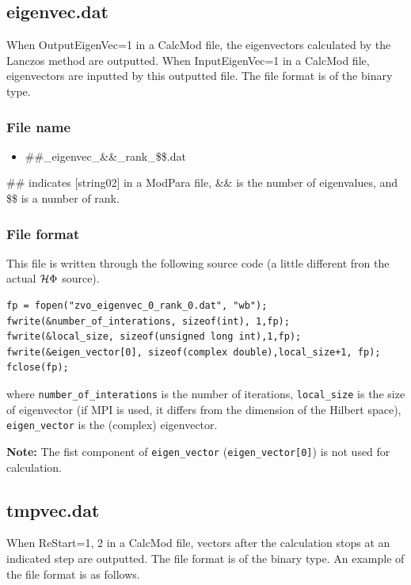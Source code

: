 \newpage
\subsection{eigenvec.dat}
\label{Subsec:eigenvec}
When OutputEigenVec=1 in a CalcMod file, the eigenvectors calculated by the Lanczos method are outputted. When InputEigenVec=1 in a CalcMod file, eigenvectors are inputted by this outputted file. The file format is of the binary type. 

\subsubsection{File name}
\begin{itemize}
   \item{\#\#\_eigenvec\_{\&\&}\_rank\_{\$\$}.dat}
\end{itemize}
  \#\# indicates [string02] in a ModPara file, \&\& is the number of eigenvalues, and \$\$ is a number of rank.

\subsubsection{File format}

This file is written through the following source code
(a little different fron the actual $\mathcal{H} \Phi$ source).
\\
\begin{minipage}{15cm}
\begin{screen}
\begin{verbatim}
fp = fopen("zvo_eigenvec_0_rank_0.dat", "wb");
fwrite(&number_of_interations, sizeof(int), 1,fp);
fwrite(&local_size, sizeof(unsigned long int),1,fp);
fwrite(&eigen_vector[0], sizeof(complex double),local_size+1, fp);
fclose(fp);
\end{verbatim}
\end{screen}
\end{minipage}
where \verb|number_of_interations| is the number of iterations,
\verb|local_size| is the size of eigenvector
(if MPI is used, it differs from the dimension of the Hilbert space),
\verb|eigen_vector| is the (complex) eigenvector.

{\bf Note: } The fist component of \verb|eigen_vector| (\verb|eigen_vector[0]|)
is not used for calculation.

\newpage
\subsection{{tmpvec.dat}}
\label{Subsec:restart}
When ReStart=1, 2 in a CalcMod file, vectors after the calculation stops at an indicated step are outputted. The file format is of the binary type.  An example of the file format is as follows.

